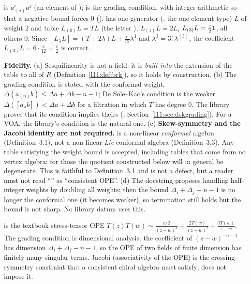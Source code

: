 \begin{dictionary}
 is $a^i_{(n)}a^j$ (an element of );  is the grading condition, with integer
arithmetic so that a negative bound forces $0$ ().  has one generator
(, the one-element type) $L$ of weight $2$ and table $L_{(0)}L = TL$ (the letter ),
$L_{(1)}L = 2L$, $L_{(3)}L = \frac c2\mathbf{1}$, all others $0$. Since $[L_\lambda L] = (T+2\lambda)L+\frac c{12}\lambda^3$ and
$\lambda^3 = 3!\,\lambda^{(3)}$, the coefficient $L_{(3)}L = 6\cdot\frac c{12} = \frac c2$ is correct.

\textbf{Fidelity.} (a) Sesquilinearity is not a field: it is \emph{built into} the extension of the table to all of $R$
(Definition~\ref{l11:def:brk}), so it holds by construction. (b) The grading condition is stated with the conformal
weight, $\Delta(a_{(n)}b)\le\Delta a+\Delta b-n-1$; De Sole--Kac's condition is the weaker
$\Delta([a_\lambda b])<\Delta a+\Delta b$ for a filtration in which $T$ has degree $0$. The library proves that its condition
implies theirs (, Section~\ref{l11:sec:dskgrading}). For a VOA, the library's condition is the natural
one. (c) \textbf{Skew-symmetry and the Jacobi identity are not required.}  is a non-linear
\emph{conformal} algebra (Definition~3.1), not a non-linear \emph{Lie} conformal algebra (Definition~3.3). Any table
satisfying the weight bound is accepted, including tables that come from no vertex algebra; for those the quotient
constructed below will in general be degenerate. This is faithful to Definition~3.1 and is not a defect, but a reader must
not read ``'' as ``consistent OPE''. (d) The docstring proposes handling half-integer weights by doubling all
weights; then the bound $\Delta_i+\Delta_j-n-1$ is no longer the conformal one (it becomes weaker), so termination still
holds but the bound is not sharp. No library datum uses this.
\end{dictionary}

\begin{physics}
 is the textbook stress-tensor OPE
$T(z)T(w)\sim\frac{c/2}{(z-w)^4}+\frac{2T(w)}{(z-w)^2}+\frac{\partial T(w)}{z-w}$. The grading condition is dimensional
analysis: the coefficient of $(z-w)^{-n-1}$ has dimension $\Delta_i+\Delta_j-n-1$, so the OPE of two fields of finite dimension
has finitely many singular terms. Jacobi (associativity of the OPE) is the crossing-symmetry constraint that a consistent
chiral algebra must satisfy;  does not impose it.
\end{physics}

